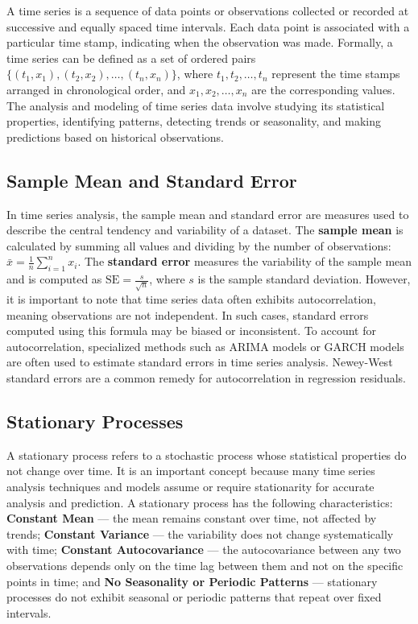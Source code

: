\documentclass[11pt,a4paper]{article}
\begin{document}
A time series is a sequence of data points or observations collected or recorded at successive and equally spaced time intervals. Each data point is associated with a particular time stamp, indicating when the observation was made. Formally, a time series can be defined as a set of ordered pairs $\{(t_1, x_1), (t_2, x_2), \ldots, (t_n, x_n)\}$, where $t_1, t_2, \ldots, t_n$ represent the time stamps arranged in chronological order, and $x_1, x_2, \ldots, x_n$ are the corresponding values. The analysis and modeling of time series data involve studying its statistical properties, identifying patterns, detecting trends or seasonality, and making predictions based on historical observations.

\subsection{Sample Mean and Standard Error}

In time series analysis, the sample mean and standard error are measures used to describe the central tendency and variability of a dataset. The \textbf{sample mean} is calculated by summing all values and dividing by the number of observations: $\bar{x} = \frac{1}{n}\sum_{i=1}^n x_i$. The \textbf{standard error} measures the variability of the sample mean and is computed as $\text{SE} = \frac{s}{\sqrt{n}}$, where $s$ is the sample standard deviation. However, it is important to note that time series data often exhibits autocorrelation, meaning observations are not independent. In such cases, standard errors computed using this formula may be biased or inconsistent. To account for autocorrelation, specialized methods such as ARIMA models or GARCH models are often used to estimate standard errors in time series analysis. Newey-West standard errors are a common remedy for autocorrelation in regression residuals.

\subsection{Stationary Processes}

A stationary process refers to a stochastic process whose statistical properties do not change over time. It is an important concept because many time series analysis techniques and models assume or require stationarity for accurate analysis and prediction. A stationary process has the following characteristics: \textbf{Constant Mean} --- the mean remains constant over time, not affected by trends; \textbf{Constant Variance} --- the variability does not change systematically with time; \textbf{Constant Autocovariance} --- the autocovariance between any two observations depends only on the time lag between them and not on the specific points in time; and \textbf{No Seasonality or Periodic Patterns} --- stationary processes do not exhibit seasonal or periodic patterns that repeat over fixed intervals.
\end{document}
